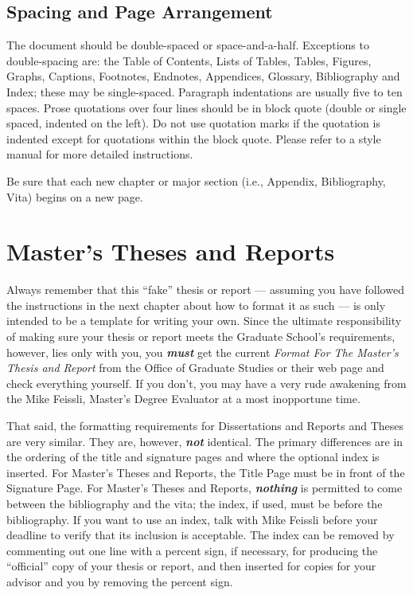 \subsection{Spacing and Page Arrangement}
%
%

The document should be double-spaced or space-and-a-half. 
Exceptions to double-spacing are: the Table of Contents, Lists of Tables, 
Tables, Figures, Graphs, Captions, Footnotes, Endnotes, 
Appendices, Glossary, Bibliography and Index; these may 
be single-spaced. Paragraph indentations are usually five to ten 
spaces. Prose quotations over four lines should be in 
block quote (double or single spaced, indented on the left). 
Do not use quotation marks if the quotation is indented except for
quotations within the block quote. Please refer to a style manual for
more detailed instructions.

Be sure that each new chapter or major section (i.e., Appendix, Bibliography,
Vita) begins on a new page.

\section{Master's Theses and Reports}

Always remember that this ``fake'' thesis or report 
%
--- assuming you have followed the instructions in the next chapter about
how to format it as such --- is only intended to be a template for writing
your own. Since the ultimate responsibility of making sure your thesis or
report meets the Graduate School's requirements, however, lies only with
you, you \textbf{\textit{must}} get the current \emph{Format For The
Master's Thesis and Report} from the Office of Graduate Studies or their web
page and check everything yourself. If you don't, you may have a very
rude awakening from the Mike Feissli, Master's Degree Evaluator at a most
inopportune time.

That said, the formatting requirements for Dissertations and Reports and
Theses are very similar. They are, however, \textbf{\textit{not}} identical.
The primary differences are in the ordering of the title and signature
pages and where the optional index is inserted. For Master's Theses
and Reports, the Title Page must be in front of the Signature Page. For
Master's Theses and Reports, \textbf{\textit{nothing}} is permitted to
come between the bibliography and the vita; the index, if used, must be
before the bibliography. If you want to use an index, talk with Mike
Feissli before your deadline to verify that its inclusion is
acceptable. The index can be removed by commenting out one line with a
percent sign, if necessary, for producing the ``official'' copy of your
thesis or report, and then inserted for copies for your advisor and
you by removing the percent sign.

